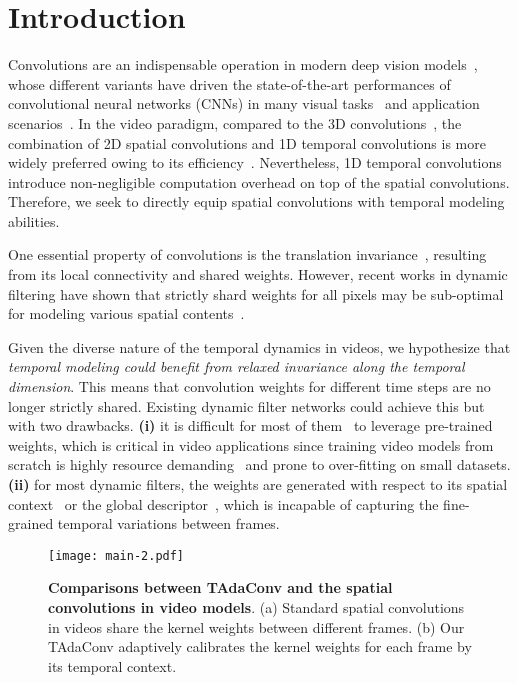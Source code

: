 \documentclass[10pt,journal,compsoc]{IEEEtran}
\begin{document}
\section{Introduction}\label{sec:introduction}
Convolutions are an indispensable operation in modern deep vision models~\cite{resnet,inception,alexnet,dai2021coatnet}, whose different variants have driven the state-of-the-art performances of convolutional neural networks (CNNs) in many visual tasks~\cite{resnext,deformable,nes,zhang2022resnest,tian2020condinst} and application scenarios~\cite{mobilenets,condconv}. 
In the video paradigm, compared to the 3D convolutions~\cite{c3d}, the combination of 2D spatial convolutions and 1D temporal convolutions is more widely preferred owing to its efficiency~\cite{r21d,p3d}.
Nevertheless, 1D temporal convolutions introduce non-negligible computation overhead on top of the spatial convolutions. Therefore, we seek to directly equip spatial convolutions with temporal modeling abilities.

One essential property of convolutions is the translation invariance~\cite{ruderman1994statistics,simoncelli2001natural}, resulting from its local connectivity and shared weights. 
However, recent works in dynamic filtering have shown that strictly shard weights for all pixels may be sub-optimal for modeling various spatial contents~\cite{ddf,wu2018dynamic}.

Given the diverse nature of the temporal dynamics in videos, we hypothesize that \textit{temporal modeling could benefit from relaxed invariance along the temporal dimension}. This means that convolution weights for different time steps are no longer strictly shared.
Existing dynamic filter networks could achieve this but with two drawbacks. \textbf{(i)} it is difficult for most of them~\cite{ddf,condconv} to leverage pre-trained weights, which is critical in video applications since training video models from scratch is highly resource demanding~\cite{slowfast,x3d} and prone to over-fitting on small datasets.
\textbf{(ii)} for most dynamic filters, the weights are generated with respect to its spatial context~\cite{ddf,dynamicfilter} or the global descriptor~\cite{dycnn,condconv}, which is incapable of capturing the fine-grained temporal variations between frames.

\begin{figure*}[t]
\centering
\texttt{[image: main-2.pdf]}
\vspace{-3mm}
\caption{\textbf{Comparisons between TAdaConv and the spatial convolutions in video models}. 
(a) Standard spatial convolutions in videos share the kernel weights between different frames. 
(b) Our TAdaConv adaptively calibrates the kernel weights for each frame by its temporal context.
}
\vspace{-5mm}
\label{fig:spatialconvcomp}
\end{figure*}
\end{document}
